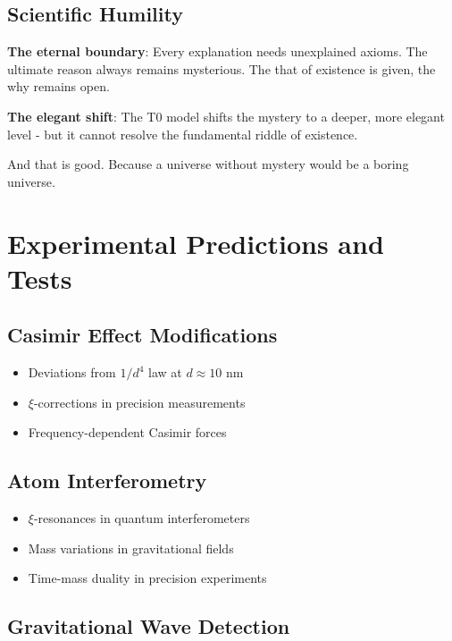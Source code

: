 \documentclass[12pt,a4paper]{article}
\newcommand{\xipar}{\xi}
\theoremstyle{definition}
\theoremstyle{remark}
\begin{document}
	\subsection{Scientific Humility}
	
	\textbf{The eternal boundary}:
	Every explanation needs unexplained axioms. The ultimate reason always remains mysterious. The that of existence is given, the why remains open.
	
	\textbf{The elegant shift}:
	The T0 model shifts the mystery to a deeper, more elegant level - but it cannot resolve the fundamental riddle of existence.
	
	And that is good. Because a universe without mystery would be a boring universe.
	
	\section{Experimental Predictions and Tests}
	
	\subsection{Casimir Effect Modifications}
	
	\begin{itemize}
		\item Deviations from $1/d^4$ law at $d \approx 10$ nm
		\item $\xipar$-corrections in precision measurements
		\item Frequency-dependent Casimir forces
	\end{itemize}
	
	\subsection{Atom Interferometry}
	
	\begin{itemize}
		\item $\xipar$-resonances in quantum interferometers
		\item Mass variations in gravitational fields
		\item Time-mass duality in precision experiments
	\end{itemize}
	
	\subsection{Gravitational Wave Detection}
	
\end{document}
